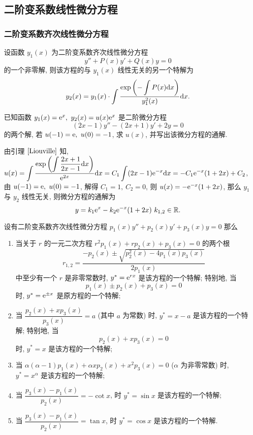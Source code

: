 \subsection{二阶变系数线性微分方程}

\subsubsection{二阶变系数齐次线性微分方程}

\begin{lemma}[Liouville 引理]
    \label{Liouville}设函数 $y_1(x)$ 为二阶变系数齐次线性微分方程 $$y''+P(x)y'+Q(x)y=0$$
    的一个非零解, 则该方程的与 $y_1(x)$ 线性无关的另一个特解为
    $$y_2(x)=y_1(x)\cdot\int\dfrac{\exp\qty(-\displaystyle\int P(x)\dd x)}{y_1^2(x)}\dd x.$$
\end{lemma}

\begin{example}[2016 数二]
    已知函数 $y_1(x)=\mathrm{e} ^x,~y_2(x)=u(x)\mathrm{e} ^x$ 是二阶微分方程 $$(2x-1)y''-(2x+1)y'+2y=0$$ 的两个解,
    若 $u(-1)=\mathrm{e} ,~u(0)=-1$, 求 $u(x)$, 并写出该微分方程的通解.
\end{example}
\begin{solution}
    由引理 $\ref{Liouville}$ 知, $u(x)=\displaystyle\int\dfrac{\exp\qty(\displaystyle\int\dfrac{2x+1}{2x-1}\dd x)}{\mathrm{e} ^{2x}}\dd x=C_1\int(2x-1)\mathrm{e} ^{-x}\dd x=-C_1\mathrm{e} ^{-x}(1+2x)+C_2$,
    由 $u(-1)=\mathrm{e} ,~u(0)=-1$, 解得 $C_1=1,~C_2=0$, 则 $u(x)=-\mathrm{e} ^{-x}(1+2x)$, 那么 $y_1$ 与 $y_2$ 线性无关, 则微分方程的通解为
    $$y=k_1\mathrm{e} ^x-k_2\mathrm{e} ^{-x}(1+2x)~  k_{1,2}\in\mathbb{R}.$$
\end{solution}

\begin{theorem}
    设有二阶变系数齐次线性微分方程 $p_1(x)y''+p_2(x)y'+p_3(x)y=0$ 那么 \label{erjiebianxis}
    \begin{enumerate}[label=(\arabic{*})]
        \item 当关于 $r$ 的一元二次方程 $r^2p_1(x)+rp_2(x)+p_3(x)=0$ 的两个根
              $$r_{1,2}=\dfrac{-p_2(x)\pm\sqrt{p_2^2(x)-4p_1(x)p_3(x)}}{2p_1(x)}$$
              中至少有一个 $r$ 是非零常数时, $y^*=\mathrm{e} ^{rx}$ 是该方程的一个特解;
              特别地, 当 $$p_1(x)\pm p_2(x)+p_3(x)=0$$
              时, $y^*=\mathrm{e} ^{\pm x}$ 是原方程的一个特解;
        \item 当 $\dfrac{p_2(x)+xp_3(x)}{p_3(x)}=a$ (其中 $a$ 为常数) 时,
              $y^*=x-a$ 是该方程的一个特解; 特别地, 当 $$p_2(x)+xp_3(x)=0$$ 时,
              $y^*=x$ 是该方程的一个特解;
        \item 当 $\alpha(\alpha-1)p_1(x)+\alpha xp_2(x)+x^2p_3(x)=0$ ($\alpha$ 为非零常数) 时,
              $y^*=x^\alpha$ 是该方程的一个特解;
        \item 当 $\dfrac{p_3(x)-p_1(x)}{p_2(x)}=-\cot x$, 时 $y^*=\sin x$ 是该方程的一个特解;
        \item 当 $\dfrac{p_3(x)-p_1(x)}{p_2(x)}=\tan x$, 时 $y^*=\cos x$ 是该方程的一个特解.
    \end{enumerate}
\end{theorem}

